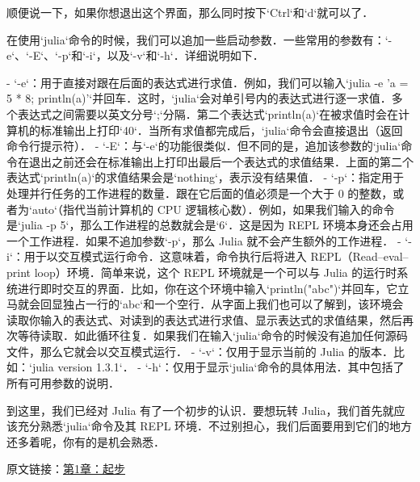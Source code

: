 顺便说一下，如果你想退出这个界面，那么同时按下`Ctrl`和`d`就可以了．

在使用`julia`命令的时候，我们可以追加一些启动参数．一些常用的参数有：`-e`、`-E`、`-p`和`-i`，以及`-v`和`-h`．详细说明如下．

- `-e`：用于直接对跟在后面的表达式进行求值．例如，我们可以输入`julia -e 'a = 5 * 8; println(a)'`并回车．这时，`julia`会对单引号内的表达式进行逐一求值．多个表达式之间需要以英文分号`;`分隔．第二个表达式`println(a)`在被求值时会在计算机的标准输出上打印`40`．当所有求值都完成后，`julia`命令会直接退出（返回命令行提示符）．
- `-E`：与`-e`的功能很类似．但不同的是，追加该参数的`julia`命令在退出之前还会在标准输出上打印出最后一个表达式的求值结果．上面的第二个表达式`println(a)`的求值结果会是`nothing`，表示没有结果值．
- `-p`：指定用于处理并行任务的工作进程的数量．跟在它后面的值必须是一个大于 0 的整数，或者为`auto`（指代当前计算机的 CPU 逻辑核心数）．例如，如果我们输入的命令是`julia -p 5`，那么工作进程的总数就会是`6`．这是因为 REPL 环境本身还会占用一个工作进程．如果不追加参数`-p`，那么 Julia 就不会产生额外的工作进程．
- `-i`：用于以交互模式运行命令．这意味着，命令执行后将进入 REPL（Read–eval–print loop）环境．简单来说，这个 REPL 环境就是一个可以与 Julia 的运行时系统进行即时交互的界面．比如，你在这个环境中输入`println("abc")`并回车，它立马就会回显独占一行的`abc`和一个空行．从字面上我们也可以了解到，该环境会读取你输入的表达式、对读到的表达式进行求值、显示表达式的求值结果，然后再次等待读取．如此循环往复．如果我们在输入`julia`命令的时候没有追加任何源码文件，那么它就会以交互模式运行．
- `-v`：仅用于显示当前的 Julia 的版本．比如：`julia version 1.3.1`．
- `-h`：仅用于显示`julia`命令的具体用法．其中包括了所有可用参数的说明．

到这里，我们已经对 Julia 有了一个初步的认识．要想玩转 Julia，我们首先就应该充分熟悉`julia`命令及其 REPL 环境．不过别担心，我们后面要用到它们的地方还多着呢，你有的是机会熟悉．

原文链接：\href{https://github.com/hyper0x/JuliaBasics/blob/master/book/ch01.md}{第1章：起步}